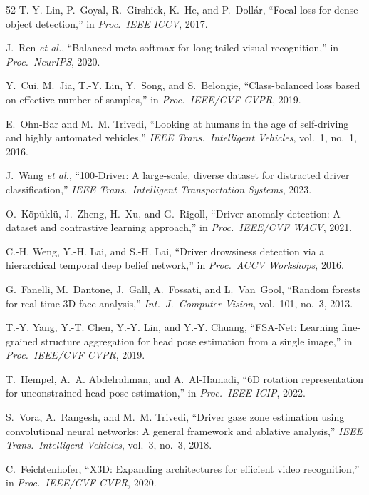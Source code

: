 \documentclass[journal]{IEEEtran}
\begin{document}
\begin{thebibliography}{52}
 T.-Y. Lin, P.~Goyal, R.~Girshick, K.~He, and
P.~Doll\'ar, ``Focal loss for dense object detection,'' in \emph{Proc.\
IEEE ICCV}, 2017.

 J.~Ren \emph{et al.}, ``Balanced meta-softmax for
long-tailed visual recognition,'' in \emph{Proc.\ NeurIPS}, 2020.

 Y.~Cui, M.~Jia, T.-Y. Lin, Y.~Song, and
S.~Belongie, ``Class-balanced loss based on effective number of samples,''
in \emph{Proc.\ IEEE/CVF CVPR}, 2019.


 E.~Ohn-Bar and M.~M. Trivedi, ``Looking at
humans in the age of self-driving and highly automated vehicles,''
\emph{IEEE Trans.\ Intelligent Vehicles}, vol.~1, no.~1, 2016.

 J.~Wang \emph{et al.}, ``100-Driver: A
large-scale, diverse dataset for distracted driver classification,''
\emph{IEEE Trans.\ Intelligent Transportation Systems}, 2023.

 O.~K\"op\"ukl\"u, J.~Zheng, H.~Xu, and G.~Rigoll,
``Driver anomaly detection: A dataset and contrastive learning approach,''
in \emph{Proc.\ IEEE/CVF WACV}, 2021.

 C.-H. Weng, Y.-H. Lai, and S.-H. Lai, ``Driver
drowsiness detection via a hierarchical temporal deep belief network,'' in
\emph{Proc.\ ACCV Workshops}, 2016.

 G.~Fanelli, M.~Dantone, J.~Gall, A.~Fossati, and
L.~Van~Gool, ``Random forests for real time 3D face analysis,''
\emph{Int.\ J.\ Computer Vision}, vol.~101, no.~3, 2013.

 T.-Y. Yang, Y.-T. Chen, Y.-Y. Lin, and
Y.-Y. Chuang, ``FSA-Net: Learning fine-grained structure aggregation for
head pose estimation from a single image,'' in \emph{Proc.\ IEEE/CVF CVPR},
2019.

 T.~Hempel, A.~A. Abdelrahman, and
A.~Al-Hamadi, ``6D rotation representation for unconstrained head pose
estimation,'' in \emph{Proc.\ IEEE ICIP}, 2022.

 S.~Vora, A.~Rangesh, and M.~M. Trivedi, ``Driver
gaze zone estimation using convolutional neural networks: A general
framework and ablative analysis,'' \emph{IEEE Trans.\ Intelligent
Vehicles}, vol.~3, no.~3, 2018.

 C.~Feichtenhofer, ``X3D: Expanding
architectures for efficient video recognition,'' in \emph{Proc.\ IEEE/CVF
CVPR}, 2020.


\end{thebibliography}
\end{document}
